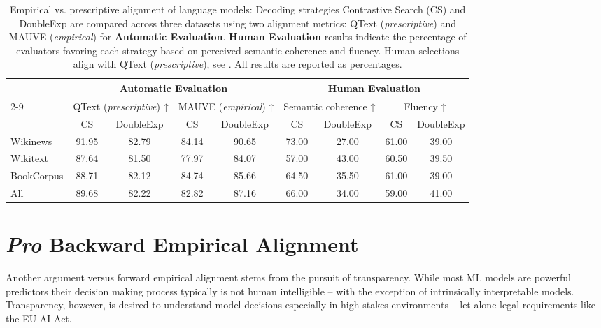 \documentclass{article}
\theoremstyle{plain}
\theoremstyle{definition}
\theoremstyle{remark}
\begin{document}
\begin{table*}[t]
\centering
\small
\caption{Empirical vs. prescriptive alignment of language models: Decoding strategies Contrastive Search (CS) and DoubleExp are compared across three datasets using two alignment metrics: QText (\textit{prescriptive}) and MAUVE (\textit{empirical}) for \textbf{Automatic Evaluation}. \textbf{Human Evaluation} results indicate the percentage of evaluators favoring each strategy based on perceived semantic coherence and fluency. Human selections align with QText (\textit{prescriptive}), see \citet{garces-arias-etal-2024-adaptive}. All results are reported as percentages.}

\label{tab:autom_eval_main}
\begin{tabular}{|l|cc|cc||cc|cc|}
\hline
& \multicolumn{4}{c||}{\textbf{Automatic Evaluation}} 
& \multicolumn{4}{c|}{\textbf{Human Evaluation}} \\
\cline{2-9}
\multirow{3}{*}{\textbf{Dataset}} 
& \multicolumn{2}{c|}{QText (\textit{prescriptive}) ↑} & \multicolumn{2}{c||}{MAUVE (\textit{empirical}) ↑} 
& \multicolumn{2}{c|}{Semantic coherence ↑} & \multicolumn{2}{c|}{Fluency ↑} \\
& CS & DoubleExp & CS & DoubleExp & CS & DoubleExp & CS & DoubleExp \\
\hline
Wikinews    & 91.95 & 82.79 & 84.14 & 90.65 & 73.00 & 27.00 & 61.00 & 39.00 \\
Wikitext    & 87.64 & 81.50 & 77.97 & 84.07 & 57.00 & 43.00 & 60.50 & 39.50 \\
BookCorpus  & 88.71 & 82.12 & 84.74 & 85.66 & 64.50 & 35.50 & 61.00 & 39.00 \\
\hline
\hline
All         & 89.68 & 82.22 & 82.82 & 87.16 & 66.00 & 34.00 & 59.00 & 41.00 \\
\hline
\end{tabular}
\vspace{1.5cm}
\end{table*}




\section{\textit{Pro} Backward Empirical Alignment}\label{sec:backward}
Another argument versus forward empirical alignment stems from the pursuit of transparency.
While most ML models are powerful predictors their decision making process typically is not human intelligible -- with the exception of intrinsically interpretable models. Transparency, however, is desired to understand model decisions especially in high-stakes environments -- let alone legal requirements like the EU AI Act. 
\end{document}
